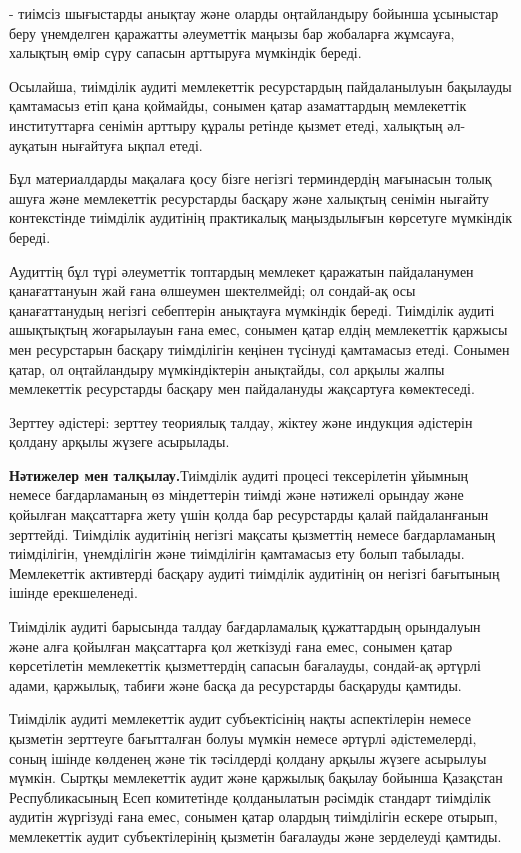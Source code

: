 - тиімсіз шығыстарды анықтау және оларды оңтайландыру бойынша ұсыныстар
беру үнемделген қаражатты әлеуметтік маңызы бар жобаларға жұмсауға,
халықтың өмір сүру сапасын арттыруға мүмкіндік береді.

Осылайша, тиімділік аудиті мемлекеттік ресурстардың пайдаланылуын
бақылауды қамтамасыз етіп қана қоймайды, сонымен қатар азаматтардың
мемлекеттік институттарға сенімін арттыру құралы ретінде қызмет етеді,
халықтың әл-ауқатын нығайтуға ықпал етеді.

Бұл материалдарды мақалаға қосу бізге негізгі терминдердің мағынасын
толық ашуға және мемлекеттік ресурстарды басқару және халықтың сенімін
нығайту контекстінде тиімділік аудитінің практикалық маңыздылығын
көрсетуге мүмкіндік береді.

Аудиттің бұл түрі әлеуметтік топтардың мемлекет қаражатын пайдаланумен
қанағаттануын жай ғана өлшеумен шектелмейді; ол сондай-ақ осы
қанағаттанудың негізгі себептерін анықтауға мүмкіндік береді. Тиімділік
аудиті ашықтықтың жоғарылауын ғана емес, сонымен қатар елдің мемлекеттік
қаржысы мен ресурстарын басқару тиімділігін кеңінен түсінуді қамтамасыз
етеді. Сонымен қатар, ол оңтайландыру мүмкіндіктерін анықтайды, сол
арқылы жалпы мемлекеттік ресурстарды басқару мен пайдалануды жақсартуға
көмектеседі.

Зерттеу әдістері: зерттеу теориялық талдау, жіктеу және индукция
әдістерін қолдану арқылы жүзеге асырылады.

{\bfseries Нәтижелер мен талқылау.}Тиімділік аудиті процесі тексерілетін
ұйымның немесе бағдарламаның өз міндеттерін тиімді және нәтижелі орындау
және қойылған мақсаттарға жету үшін қолда бар ресурстарды қалай
пайдаланғанын зерттейді. Тиімділік аудитінің негізгі мақсаты қызметтің
немесе бағдарламаның тиімділігін, үнемділігін және тиімділігін
қамтамасыз ету болып табылады. Мемлекеттік активтерді басқару аудиті
тиімділік аудитінің он негізгі бағытының ішінде ерекшеленеді.

Тиімділік аудиті барысында талдау бағдарламалық құжаттардың орындалуын
және алға қойылған мақсаттарға қол жеткізуді ғана емес, сонымен қатар
көрсетілетін мемлекеттік қызметтердің сапасын бағалауды, сондай-ақ
әртүрлі адами, қаржылық, табиғи және басқа да ресурстарды басқаруды
қамтиды.

Тиімділік аудиті мемлекеттік аудит субъектісінің нақты аспектілерін
немесе қызметін зерттеуге бағытталған болуы мүмкін немесе әртүрлі
әдістемелерді, соның ішінде көлденең және тік тәсілдерді қолдану арқылы
жүзеге асырылуы мүмкін. Сыртқы мемлекеттік аудит және қаржылық бақылау
бойынша Қазақстан Республикасының Есеп комитетінде қолданылатын рәсімдік
стандарт тиімділік аудитін жүргізуді ғана емес, сонымен қатар олардың
тиімділігін ескере отырып, мемлекеттік аудит субъектілерінің қызметін
бағалауды және зерделеуді қамтиды.


